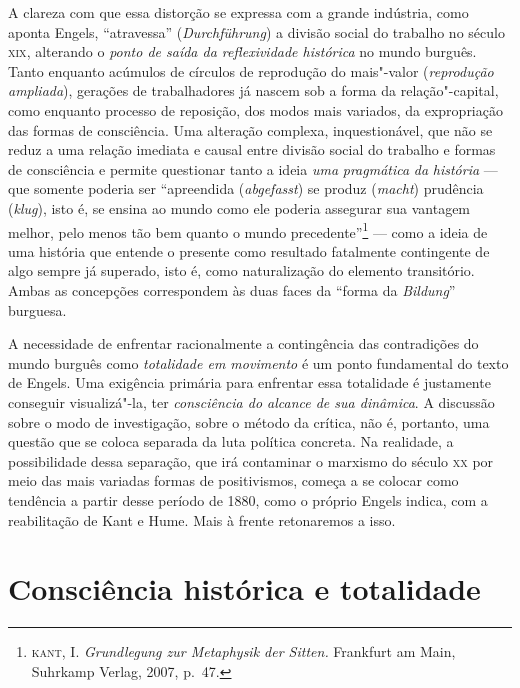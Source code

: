 A clareza com que essa distorção se expressa com a grande indústria,
como aponta Engels, ``atravessa'' (\emph{Durchführung}) a divisão social
do trabalho no século \textsc{xix}, alterando o \emph{ponto de saída da
reflexividade histórica} no mundo burguês. Tanto enquanto acúmulos de
círculos de reprodução do mais"-valor (\emph{reprodução ampliada}),
gerações de trabalhadores já nascem sob a forma da relação"-capital,
como enquanto processo de reposição, dos modos mais variados, da
expropriação das formas de consciência. Uma alteração complexa,
inquestionável, que não se reduz a uma relação imediata e causal entre
divisão social do trabalho e formas de consciência e permite questionar
tanto a ideia \emph{uma} \emph{pragmática} \emph{da} \emph{história} ---
que somente poderia ser ``apreendida (\emph{abgefasst}) se produz %
(\emph{macht}) prudência (\emph{klug}), isto é, se ensina ao mundo como
ele poderia assegurar sua vantagem melhor, pelo menos tão bem quanto o
mundo precedente''\footnote{\textsc{kant}, I. \emph{Grundlegung zur
  Metaphysik der Sitten.} Frankfurt am Main, Suhrkamp Verlag, 2007, p.~47.}
--- como a ideia de uma história que entende o presente como resultado
fatalmente contingente de algo sempre já superado, isto é, como
naturalização do elemento transitório. Ambas as concepções correspondem
às duas faces da ``forma da \emph{Bildung}'' burguesa.

A necessidade de enfrentar racionalmente a contingência das contradições
do mundo burguês como \emph{totalidade em movimento} é um ponto
fundamental do texto de Engels. Uma exigência primária para enfrentar
essa totalidade é justamente conseguir visualizá"-la, ter
\emph{consciência do alcance de sua dinâmica}. A discussão sobre o modo
de investigação, sobre o método da crítica, não é, portanto, uma questão
que se coloca separada da luta política concreta. Na realidade, a
possibilidade dessa separação, que irá contaminar o marxismo do século
\textsc{xx} por meio das mais variadas formas de positivismos, começa a
se colocar como tendência a partir desse período de 1880, como o próprio
Engels indica, com a reabilitação de Kant e Hume. Mais à frente
retonaremos a isso.

\section*{Consciência histórica e totalidade}

